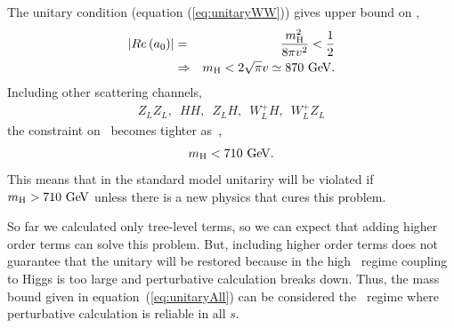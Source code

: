 The unitary condition (equation (\ref{eq:unitaryWW})) gives upper bound on \mHi, 
\begin{eqnarray} 
\left| Re \left( a_0 \right) \right| 
&=&  \frac{m_{\mathrm{H}}^2}{8\pi v^2} < \frac{1}{2} \\ 
&\Rightarrow& 
m_{\mathrm{H}} < 2 \sqrt{\pi} v \simeq 870~\mathrm{Ge\kern -0.1em V}. 
\end{eqnarray} 
Including other scattering channels, 
\begin{eqnarray} 
Z_LZ_L, \,\,\, HH, \,\,\, Z_LH, \,\,\, W_L^+H, \,\,\, W^+_LZ_L 
\end{eqnarray} 
the constraint on \mHi\ becomes tighter as~\cite{Djouadi20081}, 
\begin{eqnarray} 
\label{eq:unitaryAll}
m_{\mathrm{H}} < 710~\mathrm{Ge\kern -0.1em V}.
\end{eqnarray}
This means that in the standard model unitariry will be violated if $m_{\mathrm{H}}>710~\mathrm{Ge\kern -0.1em V}$
unless there is a new physics that cures this problem. 

So far we calculated only tree-level terms, so we can expect that adding 
higher order terms can solve this problem. But, including higher order 
terms does not guarantee that the unitary will be restored because 
in the high \mHi\ regime coupling to Higgs is too large and perturbative 
calculation breaks down. Thus, the mass bound given in equation~(\ref{eq:unitaryAll})  
can be considered the \mHi~regime where perturbative calculation is reliable 
in all $s$.

